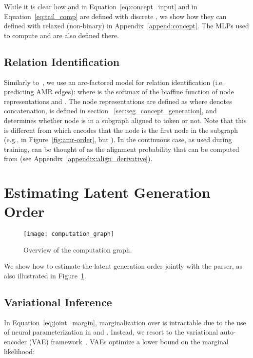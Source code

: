 \documentclass[11pt]{article}
\begin{document}
While it is clear how  and  in Equation~\ref{eq:concept_input} and  in Equation~\ref{eq:tail_comp} are defined with discrete , we show
how they can defined with relaxed (non-binary)  in Appendix~\ref{append:concept}. The MLPs used to compute  and  are also defined there. 




\subsection{Relation Identification}
\label{subsect:rel}
Similarly to~, we use an arc-factored model for relation identification (i.e. predicting AMR edges): 
where  is the softmax of the biaffine function of node representations   and .
The  node representations are defined as 
where  denotes concatenation,  is defined in section ~\ref{sec:seg_concept_generation}, and  determines whether node  is in a subgraph aligned to token  or not. Note that this is different from  which encodes that the node  is the first node in the subgraph (e.g., in Figure~\ref{fig:amr-order},
 but ). In the continuous case, as  used during training,   can be thought of as the alignment probability that can be computed
from  (see Appendix~\ref{appendix:align_derivative}). 








\section{Estimating Latent Generation Order} \label{sec:latent}


\begin{figure}[t!]
\centering
\texttt{[image: computation\_graph]}
\vspace{-2ex}
\caption{Overview of the computation graph.}
\label{fig:comp-graph}
\end{figure}


We show how to estimate the latent generation order jointly with the parser, as also illustrated in Figure~\ref{fig:comp-graph}. 


\subsection{Variational Inference}
In Equation~\ref{eq:joint_margin}, marginalization over  is intractable due to the use of neural parameterization in  and . Instead, we resort to the variational auto-encoder (VAE) framework~\cite{kingma2013auto}. VAEs optimize a lower bound on the   marginal likelihood:
\end{document}
